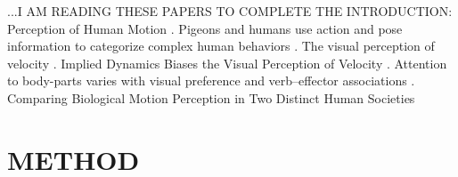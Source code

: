 \documentclass{sigchi}
\begin{document}


...I AM READING THESE PAPERS TO COMPLETE THE INTRODUCTION:
Perception of Human Motion \cite{Blake2007}.
Pigeons and humans use action and pose information to categorize complex human behaviors
\cite{Qadri201716}. The visual perception of velocity \cite{Brown1931}.
Implied Dynamics Biases the Visual Perception of Velocity \cite{LaScaleia2014}.
Attention to body-parts varies with visual preference and verb--effector associations \cite{Boyer2017}.
Comparing Biological Motion Perception in Two Distinct Human Societies \cite{Pica2011}



\section{METHOD}
\end{document}
